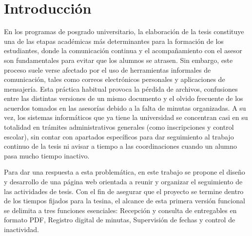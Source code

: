 \chapter{Introducción}
\label{cap:introduccion}

En los programas de posgrado universitario, la elaboración de la tesis constituye una de las etapas académicas más determinantes para la formación de los estudiantes, donde la comunicación continua y el acompañamiento con el asesor son fundamentales para evitar que los alumnos se atrasen. Sin embargo, este proceso suele verse afectado por el uso de herramientas informales de comunicación, tales como correos electrónicos personales y aplicaciones de mensajería. Esta práctica habitual provoca la pérdida de archivos, confusiones entre las distintas versiones de un mismo documento y el olvido frecuente de los acuerdos tomados en las asesorías debido a la falta de minutas organizadas. A su vez, los sistemas informáticos que ya tiene la universidad se concentran casi en su totalidad en trámites administrativos generales (como inscripciones y control escolar), sin contar con apartados específicos para dar seguimiento al trabajo continuo de la tesis ni avisar a tiempo a las coordinaciones cuando un alumno pasa mucho tiempo inactivo.

Para dar una respuesta a esta problemática, en este trabajo se propone el diseño y desarrollo de una página web orientada a reunir y organizar el seguimiento de las actividades de tesis. Con el fin de asegurar que el proyecto se termine dentro de los tiempos fijados para la tesina, el alcance de esta primera versión funcional se delimita a tres funciones esenciales: Recepción y consulta de entregables en formato PDF, Registro digital de minutas, Supervisión de fechas y control de inactividad. 


\clearpage

\clearpage


